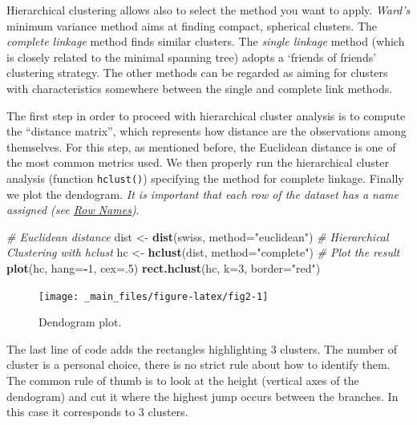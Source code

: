 \documentclass[
]{svmono}
\newenvironment{Shaded}{\begin{snugshade}}{\end{snugshade}}
\newcommand{\AttributeTok}[1]{\textcolor[rgb]{0.13,0.29,0.53}{#1}}
\newcommand{\CommentTok}[1]{\textcolor[rgb]{0.56,0.35,0.01}{\textit{#1}}}
\newcommand{\DecValTok}[1]{\textcolor[rgb]{0.00,0.00,0.81}{#1}}
\newcommand{\FunctionTok}[1]{\textcolor[rgb]{0.13,0.29,0.53}{\textbf{#1}}}
\newcommand{\NormalTok}[1]{#1}
\newcommand{\OtherTok}[1]{\textcolor[rgb]{0.56,0.35,0.01}{#1}}
\newcommand{\SpecialCharTok}[1]{\textcolor[rgb]{0.81,0.36,0.00}{\textbf{#1}}}
\newcommand{\StringTok}[1]{\textcolor[rgb]{0.31,0.60,0.02}{#1}}
\begin{document}
Hierarchical clustering allows also to select the method you want to
apply. \emph{Ward's} minimum variance method aims at finding compact,
spherical clusters. The \emph{complete linkage} method finds similar
clusters. The \emph{single linkage} method (which is closely related to the
minimal spanning tree) adopts a `friends of friends' clustering
strategy. The other methods can be regarded as aiming for clusters with
characteristics somewhere between the single and complete link methods.

The first step in order to proceed with hierarchical cluster analysis is
to compute the ``distance matrix'', which represents how distance are the
observations among themselves. For this step, as mentioned before, the
Euclidean distance is one of the most common metrics used. We then
properly run the hierarchical cluster analysis (function \texttt{hclust()})
specifying the method for complete linkage. Finally we plot the
dendogram. \emph{It is important that each row of the dataset has a name
assigned (see \protect\hyperlink{row-names}{Row Names})}.

\begin{Shaded}
\begin{Highlighting}[]
\CommentTok{\# Euclidean distance}
\NormalTok{dist }\OtherTok{\textless{}{-}} \FunctionTok{dist}\NormalTok{(swiss, }\AttributeTok{method=}\StringTok{"euclidean"}\NormalTok{)}
\CommentTok{\# Hierarchical Clustering with hclust}
\NormalTok{hc }\OtherTok{\textless{}{-}} \FunctionTok{hclust}\NormalTok{(dist, }\AttributeTok{method=}\StringTok{"complete"}\NormalTok{)}
\CommentTok{\# Plot the result}
\FunctionTok{plot}\NormalTok{(hc, }\AttributeTok{hang=}\SpecialCharTok{{-}}\DecValTok{1}\NormalTok{, }\AttributeTok{cex=}\NormalTok{.}\DecValTok{5}\NormalTok{)}
\FunctionTok{rect.hclust}\NormalTok{(hc, }\AttributeTok{k=}\DecValTok{3}\NormalTok{, }\AttributeTok{border=}\StringTok{"red"}\NormalTok{)}
\end{Highlighting}
\end{Shaded}

\begin{figure}[H]
\texttt{[image: \_main\_files/figure-latex/fig2-1]} \caption{Dendogram plot.}\label{fig:fig2}
\end{figure}

The last line of code adds the rectangles highlighting 3 clusters. The
number of cluster is a personal choice, there is no strict rule about
how to identify them. The common rule of thumb is to look at the height
(vertical axes of the dendogram) and cut it where the highest jump
occurs between the branches. In this case it corresponds to 3 clusters.
\end{document}
